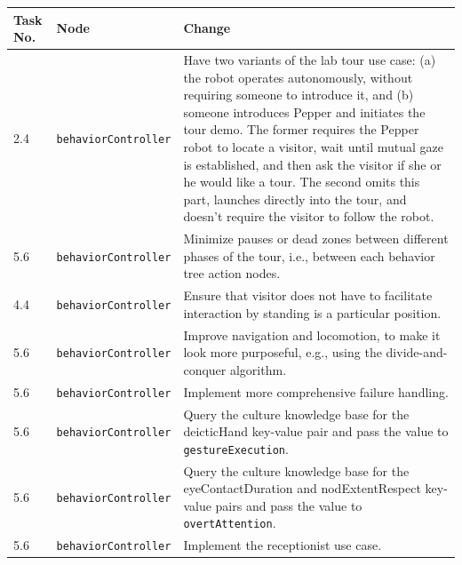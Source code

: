 \documentclass{CSSRforAfrica}
\begin{document}
\begin{center}
\begin{table}[H]
\begin{tabularx}{\linewidth}{| l | l | X |}
\hline 
{\small Task No.}                               & {\small Node }                                                 &  {\small Change}       \\
\hline
{\footnotesize 2.4 }  & {\footnotesize \verb+behaviorController+}     & {\footnotesize Have two variants of the lab tour use case: (a) the robot operates autonomously, without requiring someone to introduce it, and (b) someone introduces Pepper and initiates the tour demo.    The former requires the Pepper robot to locate a visitor, wait until mutual gaze is established, and then ask the visitor if she or he would like a tour. The second omits this part, launches directly into the tour, and doesn't require the visitor to follow the robot.} \\ 
\hline
{\footnotesize 5.6 }  & {\footnotesize \verb+behaviorController+}     & {\footnotesize Minimize pauses or dead zones between different phases of the tour, i.e., between each behavior tree action nodes.   } \\ 
\hline
{\footnotesize 4.4 }  & {\footnotesize \verb+behaviorController+}     & {\footnotesize  Ensure that visitor does not have to facilitate interaction by standing is a particular position.} \\ 
\hline
{\footnotesize 5.6 }  & {\footnotesize \verb+behaviorController+}     & {\footnotesize  Improve navigation and locomotion, to make it look more purposeful, e.g., using  the divide-and-conquer algorithm.} \\ 
\hline
{\footnotesize 5.6 }  & {\footnotesize \verb+behaviorController+}     & {\footnotesize  Implement more comprehensive failure handling.} \\ 
\hline
{\footnotesize 5.6 }  & {\footnotesize \verb+behaviorController+}     & {\footnotesize  Query the culture knowledge base for the deicticHand key-value pair and pass the value to \verb+gestureExecution+.} \\ 
\hline
{\footnotesize 5.6 }  & {\footnotesize \verb+behaviorController+}     & {\footnotesize  Query the culture knowledge base for the eyeContactDuration  and nodExtentRespect key-value pairs and pass the value to \verb+overtAttention+.} \\ 
\hline
{\footnotesize 5.6 }  & {\footnotesize \verb+behaviorController+}     & {\footnotesize  Implement the receptionist use case.}\\ 

\end{tabularx}
\end{table}
\end{center}
\end{document}

